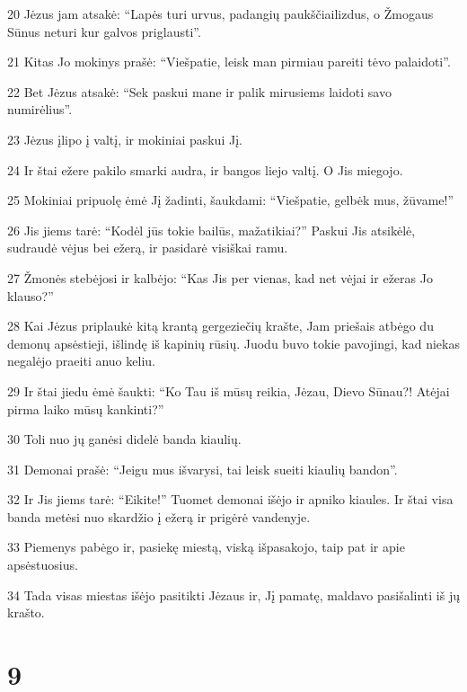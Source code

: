 \par 20 Jėzus jam atsakė: “Lapės turi urvus, padangių paukščiai­lizdus, o Žmogaus Sūnus neturi kur galvos priglausti”. 
\par 21 Kitas Jo mokinys prašė: “Viešpatie, leisk man pirmiau pareiti tėvo palaidoti”. 
\par 22 Bet Jėzus atsakė: “Sek paskui mane ir palik mirusiems laidoti savo numirėlius”. 
\par 23 Jėzus įlipo į valtį, ir mokiniai paskui Jį. 
\par 24 Ir štai ežere pakilo smarki audra, ir bangos liejo valtį. O Jis miegojo. 
\par 25 Mokiniai pripuolę ėmė Jį žadinti, šaukdami: “Viešpatie, gelbėk mus, žūvame!” 
\par 26 Jis jiems tarė: “Kodėl jūs tokie bailūs, mažatikiai?” Paskui Jis atsikėlė, sudraudė vėjus bei ežerą, ir pasidarė visiškai ramu. 
\par 27 Žmonės stebėjosi ir kalbėjo: “Kas Jis per vienas, kad net vėjai ir ežeras Jo klauso?” 
\par 28 Kai Jėzus priplaukė kitą krantą gergeziečių krašte, Jam priešais atbėgo du demonų apsėstieji, išlindę iš kapinių rūsių. Juodu buvo tokie pavojingi, kad niekas negalėjo praeiti anuo keliu. 
\par 29 Ir štai jiedu ėmė šaukti: “Ko Tau iš mūsų reikia, Jėzau, Dievo Sūnau?! Atėjai pirma laiko mūsų kankinti?” 
\par 30 Toli nuo jų ganėsi didelė banda kiaulių. 
\par 31 Demonai prašė: “Jeigu mus išvarysi, tai leisk sueiti kiaulių bandon”. 
\par 32 Ir Jis jiems tarė: “Eikite!” Tuomet demonai išėjo ir apniko kiaules. Ir štai visa banda metėsi nuo skardžio į ežerą ir prigėrė vandenyje. 
\par 33 Piemenys pabėgo ir, pasiekę miestą, viską išpasakojo, taip pat ir apie apsėstuosius. 
\par 34 Tada visas miestas išėjo pasitikti Jėzaus ir, Jį pamatę, maldavo pasišalinti iš jų krašto.



\chapter{9}


